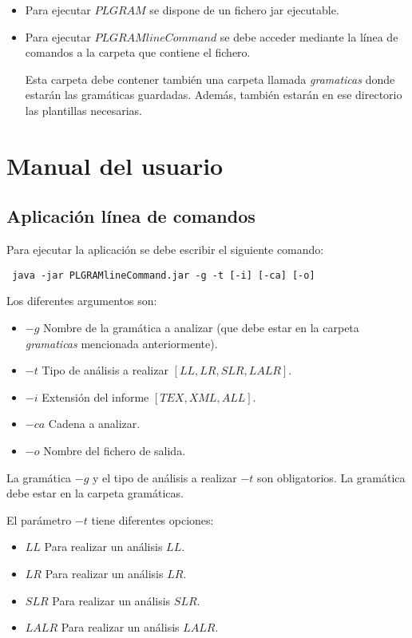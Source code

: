 \begin{itemize}
\item Para ejecutar $PLGRAM$ se dispone de un fichero jar ejecutable.
\item Para ejecutar $PLGRAMlineCommand$ se debe acceder mediante la línea de comandos a la carpeta que contiene el fichero.

Esta carpeta debe contener también una carpeta llamada \textit{gramaticas} donde estarán las gramáticas guardadas. Además, también estarán en ese directorio las plantillas necesarias.


\end{itemize}


\section{Manual del usuario}

\subsection{Aplicación línea de comandos}

Para ejecutar la aplicación se debe escribir el siguiente comando:
\begin{verbatim}
 java -jar PLGRAMlineCommand.jar -g -t [-i] [-ca] [-o] 
\end{verbatim}

 
 Los diferentes argumentos son:
 \begin{itemize}
 	\item $-g$ Nombre de la gramática a analizar (que debe estar en la carpeta \textit{gramaticas} mencionada anteriormente).
 	\item $-t$ Tipo de análisis a realizar $[LL,LR,SLR,LALR].$
 	\item $-i$ Extensión del informe $[TEX, XML, ALL]$.
 	\item $-ca$ Cadena a analizar.
 	\item $-o$ Nombre del fichero de salida.
 	
\end{itemize} 



La gramática $-g$ y el tipo de análisis a realizar $-t$ son obligatorios. La gramática debe estar en la carpeta gramáticas.
 
El parámetro $-t$ tiene diferentes opciones:
  \begin{itemize}
 	 \item $LL$ Para realizar un análisis $LL$.
 	 \item $LR$ Para realizar un análisis $LR$.
 	 \item $SLR$ Para realizar un análisis $SLR$.
 	 \item $LALR$ Para realizar un análisis $LALR$.
 \end{itemize}
  
